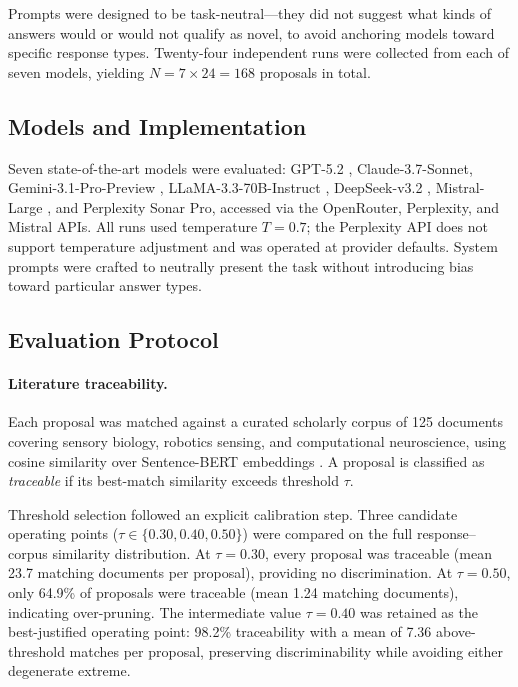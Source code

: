 \documentclass[pdflatex,sn-mathphys-num]{sn-jnl}
\begin{document}
Prompts were designed to be task-neutral---they did not suggest what kinds of answers would or
would not qualify as novel, to avoid anchoring models toward specific response types.  Twenty-four
independent runs were collected from each of seven models, yielding $N = 7 \times 24 = 168$
proposals in total.

\subsection{Models and Implementation}

Seven state-of-the-art models were evaluated: GPT-5.2 \cite{openai2023gpt4}, Claude-3.7-Sonnet,
Gemini-3.1-Pro-Preview \cite{gemini15_2024}, LLaMA-3.3-70B-Instruct \cite{llama3herd_2024},
DeepSeek-v3.2 \cite{deepseekv3_2024,deepseekr1_2025}, Mistral-Large \cite{mixtral2024}, and Perplexity
Sonar Pro, accessed via the OpenRouter, Perplexity, and Mistral APIs.  All runs used
temperature $T=0.7$; the Perplexity API does not support temperature adjustment and was
operated at provider defaults.  System prompts were crafted to neutrally present the task
without introducing bias toward particular answer types.

\subsection{Evaluation Protocol}

\paragraph{Literature traceability.}
Each proposal was matched against a curated scholarly corpus of 125 documents covering sensory
biology, robotics sensing, and computational neuroscience, using cosine similarity over
Sentence-BERT embeddings \cite{reimers2019sentencebert}.  A proposal is classified as
\emph{traceable} if its best-match similarity exceeds threshold $\tau$.

Threshold selection followed an explicit calibration step.  Three candidate operating points
($\tau \in \{0.30, 0.40, 0.50\}$) were compared on the full response--corpus similarity
distribution.  At $\tau=0.30$, every proposal was traceable (mean 23.7 matching documents per
proposal), providing no discrimination.  At $\tau=0.50$, only 64.9\% of proposals were
traceable (mean 1.24 matching documents), indicating over-pruning.  The intermediate value
$\tau=0.40$ was retained as the best-justified operating point: 98.2\% traceability with a
mean of 7.36 above-threshold matches per proposal, preserving discriminability while avoiding
either degenerate extreme.
\end{document}

